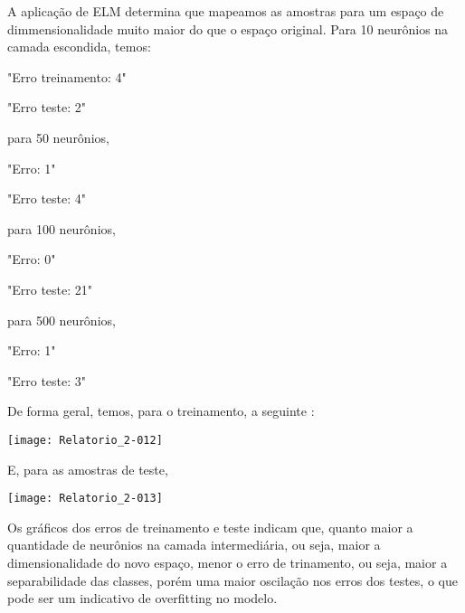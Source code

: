 \documentclass{article}
\begin{document}
A aplicação de ELM determina que mapeamos as amostras para um  espaço de dimmensionalidade muito maior do que o espaço original. Para 10 neurônios na camada escondida, temos:

\begin{Schunk}
\begin{Soutput}
[1] "Erro treinamento: 4"
\end{Soutput}
\begin{Soutput}
[1] "Erro teste: 2"
\end{Soutput}
\end{Schunk}

\noindent
para 50 neurônios,

\begin{Schunk}
\begin{Soutput}
[1] "Erro: 1"
\end{Soutput}
\begin{Soutput}
[1] "Erro teste: 4"
\end{Soutput}
\end{Schunk}


\noindent
para 100 neurônios,

\begin{Schunk}
\begin{Soutput}
[1] "Erro: 0"
\end{Soutput}
\begin{Soutput}
[1] "Erro teste: 21"
\end{Soutput}
\end{Schunk}

\noindent
para 500 neurônios,

\begin{Schunk}
\begin{Soutput}
[1] "Erro: 1"
\end{Soutput}
\begin{Soutput}
[1] "Erro teste: 3"
\end{Soutput}
\end{Schunk}

De forma geral, temos, para o treinamento, a seguinte :


\texttt{[image: Relatorio\_2-012]}

E, para as amostras de teste,

\texttt{[image: Relatorio\_2-013]}

Os gráficos dos erros de treinamento e teste indicam que, quanto maior a quantidade de neurônios na camada intermediária, ou seja, maior a dimensionalidade do novo espaço, menor o erro de trinamento, ou seja, maior a separabilidade das classes, porém uma maior oscilação nos erros dos testes, o que pode ser um indicativo de overfitting no modelo.
\end{document}
